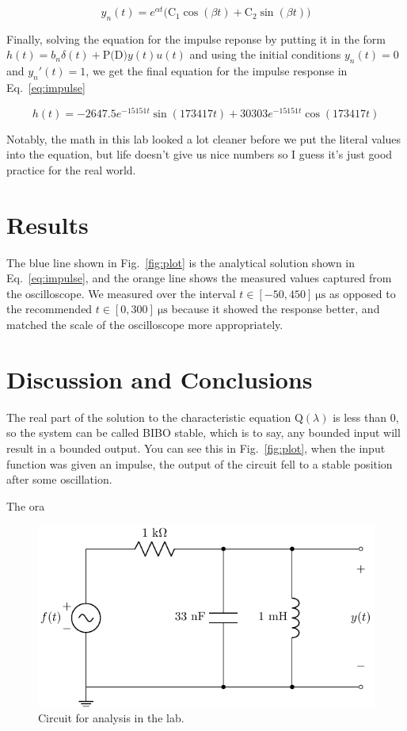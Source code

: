 \documentclass[11pt]{texMemo-gibbons}
\begin{document}
\[
y_n(t)=e^{\alpha t} \big(\text{C}_1  \cos (\beta t) + \text{C}_2 \sin (\beta t) \big) 
\]

Finally, solving the equation for the impulse reponse
by putting it in the form $h(t)=b_n \delta(t) + \text{P(D)}y(t)u(t)$
and using the initial conditions $y_n(t)=0$ and $y_n'(t)=1$,
we get the final equation for the impulse response in
Eq.~\ref{eq:impulse}

\begin{equation}
  \label{eq:impulse}
  h(t)= -2647.5 e^{-15151t} \sin(173417 t) + 30303 e^{-15151t} \cos(173417t)
\end{equation}

Notably, the math in this lab looked a lot cleaner before
we put the literal values into the equation, but life
doesn't give us nice numbers so I guess it's just good
practice for the real world.

\section{Results}
\label{sec:results}

The blue line shown in Fig.~\ref{fig:plot} is the analytical
solution shown in Eq.~\ref{eq:impulse}, and the orange line
shows the measured values captured from the oscilloscope. We 
measured over the interval $t \in [-50, 450]~\si{\us}$ as opposed
to the recommended $t \in [0, 300]~\si{\us}$ because it showed
the response better, and matched the scale of the oscilloscope
more appropriately.


\section{Discussion and Conclusions}
\label{sec:conclusions}

The real part of the solution to the characteristic
equation $\text{Q}(\lambda)$ is less than 0, so the
system can be called BIBO stable, which is to say, any
bounded input will result in a bounded output. You can
see this in Fig.~\ref{fig:plot}, when the input function
was given an impulse, the output of the circuit fell
to a stable position after some oscillation.

The ora



\clearpage

\begin{figure}[h!]
  \centering
  \includegraphics[width=0.7\linewidth]{circuits/circuit_01.pdf}
  \caption{Circuit for analysis in the lab.}
  \label{fig:circuit}
\end{figure}
\end{document}
